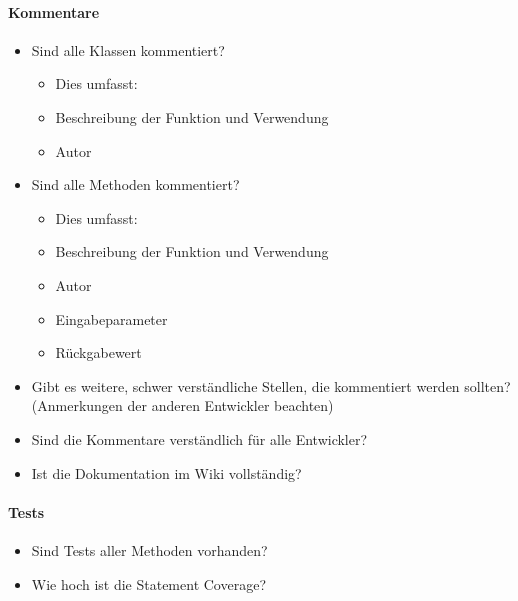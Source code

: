 \documentclass[accentcolor=tud0b,12pt,paper=a4]{tudexercise}
\begin{document}
\paragraph{Kommentare}

	\renewcommand{\labelitemi}{\scriptsize$\square$}	\renewcommand{\labelitemii}{\scriptsize$\square$}
	\renewcommand{\labelitemiii}{\scriptsize$\square$}
	\begin{itemize}
		
		\item Sind alle Klassen kommentiert?
		\begin{itemize}
			
			\item[] Dies umfasst:
			\item Beschreibung der Funktion und Verwendung
			\item Autor
		\end{itemize}
		
		\item Sind alle Methoden kommentiert?
		\begin{itemize}
			
			\item[] Dies umfasst:
			\item Beschreibung der Funktion und Verwendung
			\item Autor
			\item Eingabeparameter
			\item Rückgabewert
		\end{itemize}
		\item Gibt es weitere, schwer verständliche Stellen, die kommentiert werden sollten? (Anmerkungen der anderen Entwickler beachten)
		\item Sind die Kommentare verständlich für alle Entwickler?
		\item Ist die Dokumentation im Wiki vollständig?
	\end{itemize}


\paragraph{Tests}

	\begin{itemize}
		
		\renewcommand{\labelitemi}{\scriptsize$\square$}
		\renewcommand{\labelitemii}{\scriptsize$\square$}
		\renewcommand{\labelitemiii}{\scriptsize$\square$}
		\item Sind Tests aller Methoden vorhanden?
		\item Wie hoch ist die Statement Coverage?
	\end{itemize}
\end{document}
